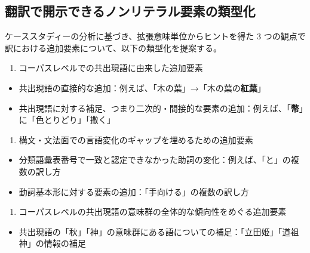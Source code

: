 \documentclass[
  letterpaper,
  DIV=11,
  numbers=noendperiod]{scrartcl}
\providecommand{\tightlist}{%
  \setlength{\itemsep}{0pt}\setlength{\parskip}{0pt}}\usepackage{longtable,booktabs,array}
\begin{document}
\subsection{翻訳で開示できるノンリテラル要素の類型化}\label{ux7ffbux8a33ux3067ux958bux793aux3067ux304dux308bux30ceux30f3ux30eaux30c6ux30e9ux30ebux8981ux7d20ux306eux985eux578bux5316}

ケーススタディーの分析に基づき、拡張意味単位からヒントを得た 3
つの観点で訳における追加要素について、以下の類型化を提案する。

\begin{enumerate}
\def\labelenumi{\arabic{enumi}.}
\tightlist
\item
  コーパスレベルでの共出現語に由来した追加要素
\end{enumerate}

\begin{itemize}
\tightlist
\item
  共出現語の直接的な追加：例えば、「木の葉」→「木の葉の\textbf{紅葉}」
\item
  共出現語に対する補足、つまり二次的・間接的な要素の追加：例えば、「\textbf{幣}」に「色とりどり」「撒く」
\end{itemize}

\begin{enumerate}
\def\labelenumi{\arabic{enumi}.}
\setcounter{enumi}{1}
\tightlist
\item
  構文・文法面での言語変化のギャップを埋めるための追加要素
\end{enumerate}

\begin{itemize}
\tightlist
\item
  分類語彙表番号で一致と認定できなかった助詞の変化：例えば、「と」の複数の訳し方
\item
  動詞基本形に対する要素の追加：「手向ける」の複数の訳し方
\end{itemize}

\begin{enumerate}
\def\labelenumi{\arabic{enumi}.}
\setcounter{enumi}{2}
\tightlist
\item
  コーパスレベルの共出現語の意味群の全体的な傾向性をめぐる追加要素
\end{enumerate}

\begin{itemize}
\tightlist
\item
  共出現語の「秋」「神」の意味群にある語についての補足：「立田姫」「道祖神」の情報の補足
\end{itemize}
\end{document}
